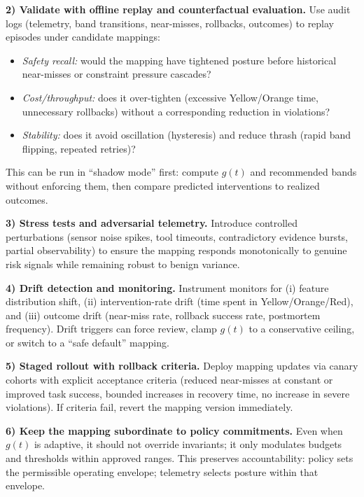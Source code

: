 \documentclass[11pt]{article}
\begin{document}
\textbf{2) Validate with offline replay and counterfactual evaluation.}
Use audit logs (telemetry, band transitions, near-misses, rollbacks, outcomes) to replay episodes under candidate mappings:
\begin{itemize}
\item \emph{Safety recall:} would the mapping have tightened posture before historical near-misses or constraint pressure cascades?
\item \emph{Cost/throughput:} does it over-tighten (excessive Yellow/Orange time, unnecessary rollbacks) without a corresponding reduction in violations?
\item \emph{Stability:} does it avoid oscillation (hysteresis) and reduce thrash (rapid band flipping, repeated retries)?
\end{itemize}
This can be run in ``shadow mode'' first: compute $g(t)$ and recommended bands without enforcing them, then compare predicted interventions to realized outcomes.

\textbf{3) Stress tests and adversarial telemetry.}
Introduce controlled perturbations (sensor noise spikes, tool timeouts, contradictory evidence bursts, partial observability)
to ensure the mapping responds monotonically to genuine risk signals while remaining robust to benign variance.

\textbf{4) Drift detection and monitoring.}
Instrument monitors for (i) feature distribution shift, (ii) intervention-rate drift (time spent in Yellow/Orange/Red), and
(iii) outcome drift (near-miss rate, rollback success rate, postmortem frequency). Drift triggers can force review, clamp
$g(t)$ to a conservative ceiling, or switch to a ``safe default'' mapping.

\textbf{5) Staged rollout with rollback criteria.}
Deploy mapping updates via canary cohorts with explicit acceptance criteria (reduced near-misses at constant or improved task success,
bounded increases in recovery time, no increase in severe violations). If criteria fail, revert the mapping version immediately.

\textbf{6) Keep the mapping subordinate to policy commitments.}
Even when $g(t)$ is adaptive, it should not override invariants; it only modulates budgets and thresholds within approved ranges.
This preserves accountability: policy sets the permissible operating envelope; telemetry selects posture within that envelope.
\end{document}

